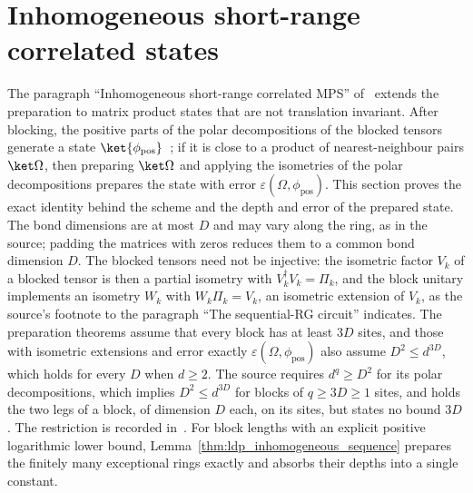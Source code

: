 \section{Inhomogeneous short-range correlated states}
\label{sec:ldp_inhomogeneous}

The paragraph ``Inhomogeneous short-range correlated MPS''
of~\cite{Malz2024Preparation} extends the preparation to matrix product states
that are not translation invariant. After blocking, the positive parts of the
polar decompositions of the blocked tensors generate a state
$\ket{\phi_{\mathrm{pos}}}$~\cite[eq.~(18)]{Malz2024Preparation}; if it is close
to a product of nearest-neighbour pairs $\ket\Omega$, then preparing $\ket\Omega$
and applying the isometries of the polar decompositions prepares the state
with error $\varepsilon(\Omega,\phi_{\mathrm{pos}})$. This section proves the
exact identity behind the scheme and the depth and error of the prepared
state. The bond dimensions are at most $D$ and may vary along the ring, as in
the source; padding the matrices with zeros reduces them to a common bond
dimension $D$. The blocked tensors need not be injective: the isometric factor
$V_k$ of a blocked tensor is then a partial isometry with
$V_k^\dagger V_k=\Pi_k$, and the block unitary implements an isometry $W_k$
with $W_k\Pi_k=V_k$, an isometric extension of $V_k$, as the source's footnote
to the paragraph ``The sequential-RG circuit'' indicates. The preparation
theorems assume that every block has at least $3D$ sites, and those with
isometric extensions and error exactly $\varepsilon(\Omega,\phi_{\mathrm{pos}})$
also assume $D^2\le d^{3D}$, which holds for every $D$ when $d\ge2$. The source
requires $d^q\ge D^2$ for its polar decompositions, which implies
$D^2\le d^{3D}$ for blocks of $q\ge3D\ge1$ sites, and holds the two legs of a
block, of dimension $D$ each, on its sites, but states no bound $3D$. The restriction
is recorded in~\cite{gap:mswc24_inhomogeneous_scope}. For block lengths with
an explicit positive logarithmic lower bound, Lemma~\ref{thm:ldp_inhomogeneous_sequence}
prepares the finitely many exceptional rings exactly and absorbs their depths
into a single constant.

